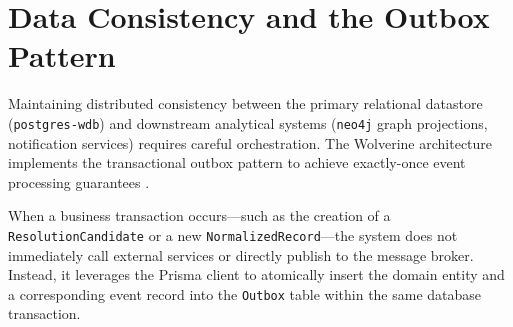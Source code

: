 \begin{table}[h]
\centering
{}
\caption{Database Inventory, Topology, and Port Mappings}
\label{tab:database-inventory}
\end{table}

\section{Data Consistency and the Outbox Pattern}
\label{sec:data-consistency}
Maintaining distributed consistency between the primary relational datastore (\texttt{postgres-wdb}) and downstream analytical systems (\texttt{neo4j} graph projections, notification services) requires careful orchestration. The Wolverine architecture implements the transactional outbox pattern to achieve exactly-once event processing guarantees \cite{kleppmann2017designing}.

When a business transaction occurs—such as the creation of a \texttt{ResolutionCandidate} or a new \texttt{NormalizedRecord}—the system does not immediately call external services or directly publish to the message broker. Instead, it leverages the Prisma client to atomically insert the domain entity and a corresponding event record into the \texttt{Outbox} table within the same database transaction.

